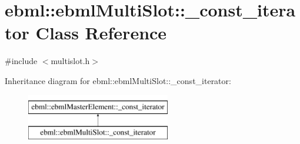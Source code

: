 \hypertarget{classebml_1_1ebmlMultiSlot_1_1__const__iterator}{}\section{ebml\+:\+:ebml\+Multi\+Slot\+:\+:\+\_\+const\+\_\+iterator Class Reference}
\label{classebml_1_1ebmlMultiSlot_1_1__const__iterator}


{\ttfamily \#include $<$multislot.\+h$>$}

Inheritance diagram for ebml\+:\+:ebml\+Multi\+Slot\+:\+:\+\_\+const\+\_\+iterator\+:\begin{figure}[H]
\begin{center}
\leavevmode
\includegraphics[height=2.000000cm]{classebml_1_1ebmlMultiSlot_1_1__const__iterator}
\end{center}
\end{figure}

